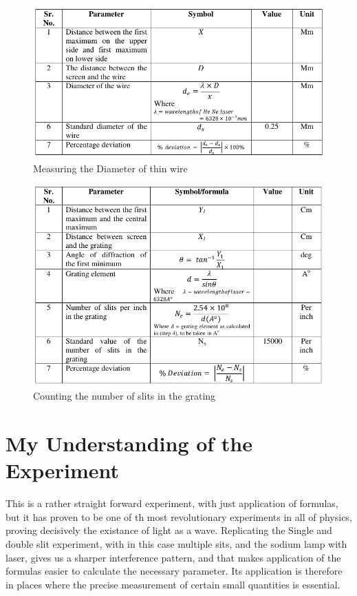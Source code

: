 \documentclass[11pt]{article}
\begin{document}
\begin{figure}[H]
	\centering
	\includegraphics[scale=0.8]{diathinwire.png}
	\caption{Measuring the Diameter of thin wire}
	\label{it}
\end{figure}

\begin{figure}[H]
	\centering
	\includegraphics[scale=0.8]{noslitsgrating.png}
	\caption{Counting the number of slits in the grating}
	\label{it}
\end{figure}


\section{My Understanding of the Experiment}

This is a rather straight forward experiment, with just application of formulas, but it has proven to be
one of th most revolutionary experiments in all of physics, proving decisively the existance of light as a wave.
Replicating the Single and double slit experiment, with in this case multiple sits, and the sodium lamp with laser, gives us
a sharper interference pattern, and that makes application of the formulas easier to calculate the necessary parameter. 
Its application is therefore in places where the precise measurement of certain small quantities is essential.
\end{document}
